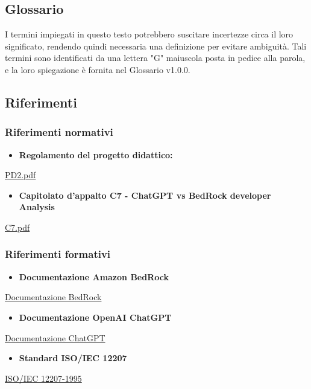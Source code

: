 \documentclass{article}
\begin{document}
\subsection{Glossario}
I termini impiegati in questo testo potrebbero suscitare incertezze circa il loro significato, rendendo quindi necessaria una definizione per evitare ambiguità. Tali termini sono identificati da una lettera "G" maiuscola posta in pedice alla parola, e la loro spiegazione è fornita nel Glossario v1.0.0.

\subsection{Riferimenti}

\subsubsection{Riferimenti normativi}
\begin{itemize}
    \item \textbf{Regolamento del progetto didattico:}
\end{itemize}
\href{https://www.math.unipd.it/~tullio/IS-1/2023/Dispense/PD2.pdf}{PD2.pdf}
\begin{itemize}
    \item \textbf{Capitolato d'appalto C7 - ChatGPT vs BedRock developer Analysis}
\end{itemize}
\href{https://www.math.unipd.it/~tullio/IS-1/2023/Progetto/C7.pdf}{C7.pdf}

\subsubsection{Riferimenti formativi}
\begin{itemize}
    \item \textbf{Documentazione Amazon BedRock}
\end{itemize}
\href{https://docs.aws.amazon.com/bedrock/latest/userguide/what-is-bedrock.html}{Documentazione BedRock}
\begin{itemize}
    \item \textbf{Documentazione OpenAI ChatGPT}
\end{itemize}
\href{https://platform.openai.com/docs/introduction}{Documentazione ChatGPT}
\begin{itemize}
    \item \textbf{Standard ISO/IEC 12207}
\end{itemize}
\href{https://www.math.unipd.it/~tullio/IS-1/2009/Approfondimenti/ISO_12207-1995.pdf}{ISO/IEC 12207-1995}
\end{document}
